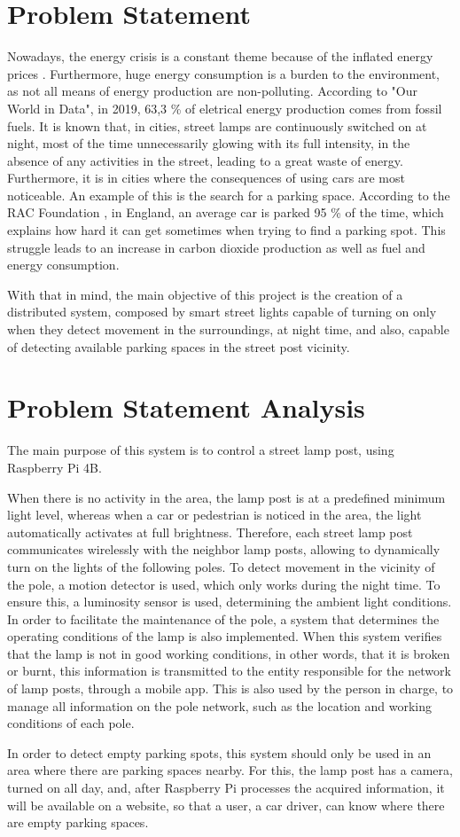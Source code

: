 \section{Problem Statement}
Nowadays, the energy crisis is a constant theme because of the inflated energy prices \cite{energy_crisis}. Furthermore, huge energy consumption is a burden to the environment, as not all means of energy production are non-polluting. According to "Our World in Data"\cite{owidenergy}, in 2019, 63,3 \% of eletrical energy production comes from fossil fuels. It is known that, in cities, street lamps are continuously switched on at night, most of the time unnecessarily glowing with its full intensity, in the absence of any activities in the street, leading to a great waste of energy. Furthermore, it is in cities where the consequences of using cars are most noticeable. An example of this is the search for a parking space. According to the RAC Foundation \cite{cars_parked}, in England, an average car is parked 95 \% of the time, which explains how hard it can get sometimes when trying to find a parking spot. This struggle leads to an increase in carbon dioxide production as well as fuel and energy consumption.

With that in mind, the main objective of this project is the creation of a  distributed system, composed by smart street lights capable of turning on only when they detect movement in the surroundings, at night time, and also, capable of detecting available parking spaces in the street post vicinity.

\clearpage
\section{Problem Statement Analysis}
The main purpose of this system is to control a street lamp post, using Raspberry Pi 4B.

When there is no activity in the area, the lamp post is at a predefined minimum light level, whereas when a car or pedestrian is noticed in the area, the light automatically activates at full brightness. Therefore, each street lamp post  communicates wirelessly with the neighbor lamp posts, allowing to dynamically turn on the lights of the following poles. To detect movement in the vicinity of the pole, a motion detector is used, which only works during the night time. To ensure this, a luminosity sensor is used, determining the ambient light conditions. In order to facilitate the maintenance of the pole, a system that determines the operating conditions of the lamp is also implemented. When this system verifies that the lamp is not in good working conditions, in other words, that it is broken or burnt, this information is transmitted to the entity responsible for the network of lamp posts, through a mobile app. This is also used by the person in charge, to manage all information on the pole network, such as the location and working conditions of each pole.

In order to detect empty parking spots, this system should only be used in an area where there are parking spaces nearby. For this, the lamp post has a camera, turned on all day, and, after Raspberry Pi processes the acquired information, it will be available on a website, so that a user, a car driver, can know where there are empty parking spaces.